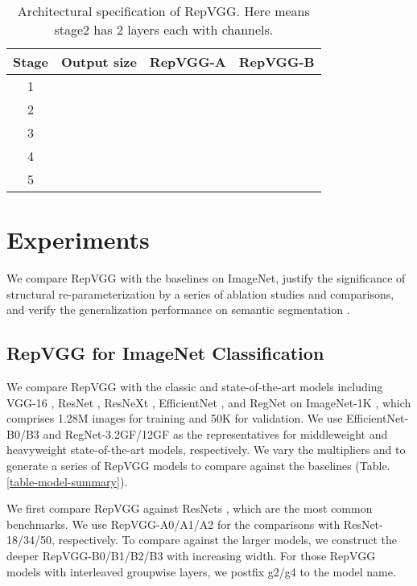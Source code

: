 \documentclass[final]{cvpr}
\begin{document}
\setlength{\tabcolsep}{4pt}
\begin{table}
	\caption{Architectural specification of RepVGG. Here  means stage2 has 2 layers each with  channels.}
	\label{table-arch-detail}
	\vspace{-0.2in}
	\begin{center}
		\small
		\begin{tabular}{c|c|l|l}
			\hline
			Stage			&	Output size			&	 RepVGG-A 		&	RepVGG-B		\\
			\hline
			1			&			&				&			\\
			2			&			&			&			\\
			3			&			&			&			\\
			4			&			&			&			\\
			5			&				&			&			\\
			\hline
		\end{tabular}
	\end{center}
	\vspace{-0.3in}
\end{table}
\setlength{\tabcolsep}{1.4pt}


\section{Experiments}

We compare RepVGG with the baselines on ImageNet, justify the significance of structural re-parameterization by a series of ablation studies and comparisons, and verify the generalization performance on semantic segmentation \cite{pspnet}.

\subsection{RepVGG for ImageNet Classification}\label{sect-0}

We compare RepVGG with the classic and state-of-the-art models including VGG-16 \cite{simonyan2014very}, ResNet \cite{he2016deep}, ResNeXt \cite{xie2017aggregated}, EfficientNet \cite{efficientnet}, and RegNet \cite{regnet} on ImageNet-1K \cite{deng2009imagenet}, which comprises 1.28M images for training and 50K for validation. We use EfficientNet-B0/B3 and RegNet-3.2GF/12GF as the representatives for middleweight and heavyweight state-of-the-art models, respectively. We vary the multipliers  and  to generate a series of RepVGG models to compare against the baselines (Table. \ref{table-model-summary}).

We first compare RepVGG against ResNets \cite{he2016deep}, which are the most common benchmarks. We use RepVGG-A0/A1/A2 for the comparisons with ResNet-18/34/50, respectively. To compare against the larger models, we construct the deeper RepVGG-B0/B1/B2/B3 with increasing width. For those RepVGG models with interleaved groupwise layers, we postfix g2/g4 to the model name. 
\end{document}
